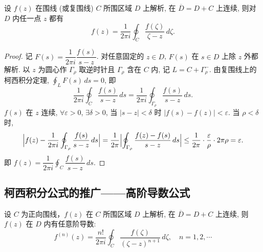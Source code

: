 \documentclass[theorem=false,mathfont=none,openany,sub3section]{easybook}
\begin{document}
\begin{theorem}
  设 $f(z)$ 在围线 (或复围线) $C$ 所围区域
  $D$ 上解析, 在 $\overline{D}=D+C$ 上连续, 则对 $D$ 内任一点 $z$ 都有
  \[
  f(z)=\frac{1}{2\pi i}\oint_{C}\frac{f(\zeta)}{\zeta-z}\,d\zeta.
  \]
\end{theorem}

\begin{proof}
  记 $F(s)=\dfrac{1}{2\pi i}\dfrac{f(s)}{s-z}$. 对任意固定的 $z\in D$, $F(s)$ 在 $s\in D$ 上除 $z$ 外都解析.
  以 $z$ 为圆心作 $\Gamma_{\rho}$ 取逆时针且 $\Gamma_{\rho}$ 含在 $C$ 内, 记 $L=C+\Gamma_{\rho}^{-}$.
  由复围线上的柯西积分定理, $\oint_{L}F(s)\,ds=0$, 即
  \[
  \frac{1}{2\pi i}\oint_{C}\frac{f(s)}{s-z}\,ds=\frac{1}{2\pi i}\oint_{\Gamma_{\rho}}\frac{f(s)}{s-z}\,ds.
  \]
  $f(s)$ 在 $z$ 连续, $\forall\varepsilon>0$, $\exists\delta>0$, 当 $|s-z|<\delta$ 时 $|f(s)-f(z)|<\varepsilon$.
  当 $\rho<\delta$ 时,
  \[
  \Bigl|f(z)-\frac{1}{2\pi i}\oint_{\Gamma_{\rho}}\frac{f(s)}{s-z}\,ds\Bigr|
  =\frac{1}{2\pi}\Bigl|\oint_{\Gamma_{\rho}}\frac{f(z)-f(s)}{s-z}\,ds\Bigr|
  \leq\frac{1}{2\pi}\cdot\frac{\varepsilon}{\rho}\cdot 2\pi\rho=\varepsilon.
  \]
  即 $f(z)=\dfrac{1}{2\pi i}\oint_{C}\dfrac{f(s)}{s-z}\,ds$.
\end{proof}

\subsection{柯西积分公式的推广——高阶导数公式}

\begin{theorem}
  设 $C$ 为正向围线，$f(z)$ 在 $C$ 所围区域 $D$ 上解析, 在
  $\overline{D}=D+C$ 上连续, 则 $f(z)$ 在 $D$ 内有任意阶导数:
  \[
  f^{(n)}(z)=\frac{n!}{2\pi i}\oint_{C}\frac{f(\zeta)}{(\zeta-z)^{n+1}}\,d\zeta,\quad n=1,2,\cdots
  \]
\end{theorem}
\end{document}
